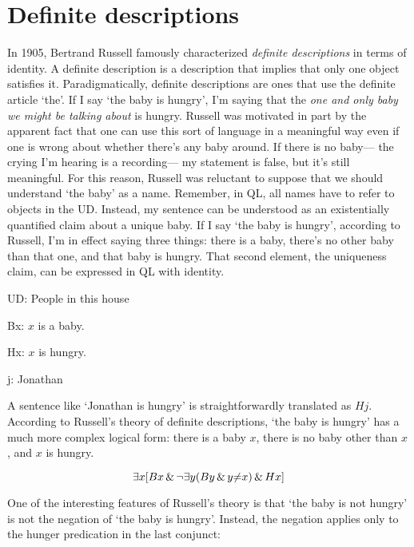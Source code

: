 \section{Definite descriptions}
\label{sec.defdesc}
In 1905, Bertrand Russell famously characterized \emph{definite descriptions} in terms of identity. A definite description is a description that implies that only one object satisfies it. Paradigmatically, definite descriptions are ones that use the definite article `the'. If I say `the baby is hungry', I'm saying that the \emph{one and only baby we might be talking about} is hungry. Russell was motivated in part by the apparent fact that one can use this sort of language in a meaningful way even if one is wrong about whether there's any baby around. If there is no baby--- the crying I'm hearing is a recording--- my statement is false, but it's still meaningful. For this reason, Russell was reluctant to suppose that we should understand `the baby' as a name. Remember, in QL, all names have to refer to objects in the UD. Instead, my sentence can be understood as an existentially quantified claim about a unique baby. If I say `the baby is hungry', according to Russell, I'm in effect saying three things: there is a baby, there's no other baby than that one, and that baby is hungry. That second element, the uniqueness claim, can be expressed in QL with identity. 

\begin{ekey}
\item[UD:]People in this house
\item[Bx:]$x$ is a baby.
\item[Hx:]$x$ is hungry.
\item[j:]Jonathan
\end{ekey}

A sentence like `Jonathan is hungry' is straightforwardly translated as $Hj$. According to Russell's theory of definite descriptions, `the baby is hungry' has a much more complex logical form: there is a baby $x$, there is no baby other than $x$, and $x$ is hungry.

\begin{equation*}
\exists x [Bx \,\&\, \neg \exists y (By \,\&\, y {\neq} x) \,\&\, Hx]
\end{equation*}

One of the interesting features of Russell's theory is that `the baby is not hungry' is not the negation of `the baby is hungry'. Instead, the negation applies only to the hunger predication in the last conjunct:

